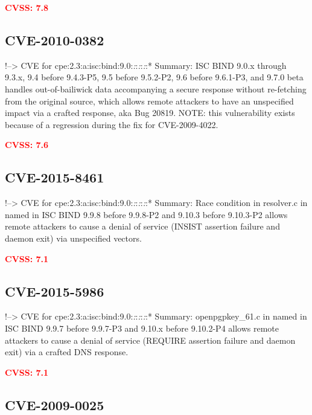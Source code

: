 \documentclass[a4paper, 12pt]{article}
\begin{document}
\textbf{\textcolor{red}{CVSS: 7.8}}

\hypertarget{cve-2010-0382}{%
\subsection{CVE-2010-0382}\label{cve-2010-0382}}

!--\textgreater{} CVE for
cpe:2.3:a:isc:bind:9.0:\emph{:}:\emph{:}:\emph{:}:* Summary: ISC BIND
9.0.x through 9.3.x, 9.4 before 9.4.3-P5, 9.5 before 9.5.2-P2, 9.6
before 9.6.1-P3, and 9.7.0 beta handles out-of-bailiwick data
accompanying a secure response without re-fetching from the original
source, which allows remote attackers to have an unspecified impact via
a crafted response, aka Bug 20819. NOTE: this vulnerability exists
because of a regression during the fix for CVE-2009-4022.

\textbf{\textcolor{red}{CVSS: 7.6}}

\hypertarget{cve-2015-8461}{%
\subsection{CVE-2015-8461}\label{cve-2015-8461}}

!--\textgreater{} CVE for
cpe:2.3:a:isc:bind:9.0:\emph{:}:\emph{:}:\emph{:}:* Summary: Race
condition in resolver.c in named in ISC BIND 9.9.8 before 9.9.8-P2 and
9.10.3 before 9.10.3-P2 allows remote attackers to cause a denial of
service (INSIST assertion failure and daemon exit) via unspecified
vectors.

\textbf{\textcolor{red}{CVSS: 7.1}}

\hypertarget{cve-2015-5986}{%
\subsection{CVE-2015-5986}\label{cve-2015-5986}}

!--\textgreater{} CVE for
cpe:2.3:a:isc:bind:9.0:\emph{:}:\emph{:}:\emph{:}:* Summary:
openpgpkey\_61.c in named in ISC BIND 9.9.7 before 9.9.7-P3 and 9.10.x
before 9.10.2-P4 allows remote attackers to cause a denial of service
(REQUIRE assertion failure and daemon exit) via a crafted DNS response.

\textbf{\textcolor{red}{CVSS: 7.1}}

\hypertarget{cve-2009-0025}{%
\subsection{CVE-2009-0025}\label{cve-2009-0025}}
\end{document}
